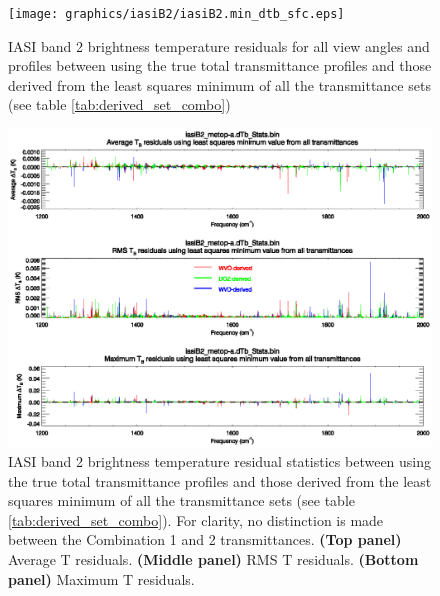 \begin{figure}[htp]
  \centering
  \texttt{[image: graphics/iasiB2/iasiB2.min\_dtb\_sfc.eps]}
  \caption{IASI band 2 brightness temperature residuals for all view angles and profiles between using the true total transmittance profiles and those derived from the least squares minimum of all the transmittance sets (see table \ref{tab:derived_set_combo})}
  \label{fig:iasiB2.min_dtb_sfc}
  \vspace{1em}
  \includegraphics[scale=0.8]{graphics/iasiB2/iasiB2.min_dtb.eps}
  \caption{IASI band 2 brightness temperature residual statistics between using the true total transmittance profiles and those derived from the least squares minimum of all the transmittance sets (see table \ref{tab:derived_set_combo}). For clarity, no distinction is made between the Combination 1 and 2 transmittances. \textbf{(Top panel)} Average T residuals. \textbf{(Middle panel)} RMS T residuals. \textbf{(Bottom panel)} Maximum T residuals.}
  \label{fig:iasiB2.min_dtb}
\end{figure}

